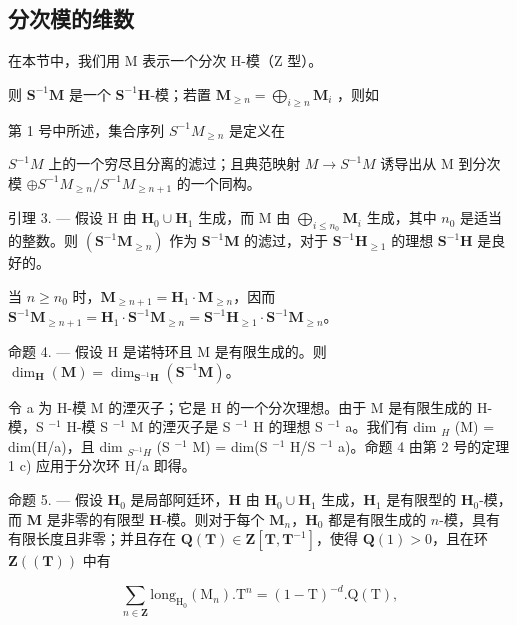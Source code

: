 \subsection{分次模的维数}

在本节中，我们用 M 表示一个分次 H-模（Z 型）。

则 \(\mathbf{S}^{-1}\mathbf{M}\) 是一个 \(\mathbf{S}^{-1}\mathbf{H}\)-模；若置 \(\mathbf{M}_{\geqslant n} = \bigoplus_{i\geqslant n}\mathbf{M}_i\) ，则如

第 1 号中所述，集合序列 \(S^{-1}M_{\geqslant n}\) 是定义在

\(S^{-1}M\) 上的一个穷尽且分离的滤过；且典范映射 \(M \to S^{-1}M\) 诱导出从 M 到分次模 \(\oplus S^{-1}M_{\geqslant n}/S^{-1}M_{\geqslant n+1}\) 的一个同构。

引理 3. --- 假设 H 由 \(\mathbf{H}_{0} \cup \mathbf{H}_{1}\) 生成，而 M 由 \(\bigoplus_{i \leqslant n_{0}} \mathbf{M}_{i}\) 生成，其中 \(n_{0}\) 是适当的整数。则 \((\mathbf{S}^{-1}\mathbf{M}_{\geqslant n})\) 作为 \(\mathbf{S}^{-1}\mathbf{M}\) 的滤过，对于 \(\mathbf{S}^{-1}\mathbf{H}_{\geqslant 1}\) 的理想 \(\mathbf{S}^{-1}\mathbf{H}\) 是良好的。

当 \(n \geqslant n_0\) 时，\(\mathbf{M}_{\geqslant n+1} = \mathbf{H}_1 \cdot \mathbf{M}_{\geqslant n}\)，因而 \(\mathbf{S}^{-1} \mathbf{M}_{\geqslant n+1} = \mathbf{H}_1 \cdot \mathbf{S}^{-1} \mathbf{M}_{\geqslant n} = \mathbf{S}^{-1} \mathbf{H}_{\geqslant 1} \cdot \mathbf{S}^{-1} \mathbf{M}_{\geqslant n}\)。

命题 4. --- 假设 H 是诺特环且 M 是有限生成的。则 \(\dim_{\mathbf{H}}(\mathbf{M}) = \dim_{\mathbf{S}^{-1}\mathbf{H}}(\mathbf{S}^{-1}\mathbf{M})\)。

令 a 为 H-模 M 的湮灭子；它是 H 的一个分次理想。由于 M 是有限生成的 H-模，S \(^{-1}\) H-模 S \(^{-1}\) M 的湮灭子是 S \(^{-1}\) H 的理想 S \(^{-1}\) a。我们有 dim \(_{H}\) (M) = dim(H/a)，且 dim \(_{S^{-1}H}\) (S \(^{-1}\) M) = dim(S \(^{-1}\) H/S \(^{-1}\) a)。命题 4 由第 2 号的定理 1 c) 应用于分次环 H/a 即得。

命题 5. --- 假设 \(\mathbf{H}_{0}\) 是局部阿廷环，\(\mathbf{H}\) 由 \(\mathbf{H}_{0} \cup \mathbf{H}_{1}\) 生成，\(\mathbf{H}_{1}\) 是有限型的 \(\mathbf{H}_{0}\)-模，而 \(\mathbf{M}\) 是非零的有限型 \(\mathbf{H}\)-模。则对于每个 \(\mathbf{M}_{n}\)，\(\mathbf{H}_{0}\) 都是有限生成的 \(n\)-模，具有有限长度且非零；并且存在 \(\mathbf{Q}(\mathbf{T}) \in \mathbf{Z}[\mathbf{T}, \mathbf{T}^{-1}]\)，使得 \(\mathbf{Q}(1) > 0\)，且在环 \(\mathbf{Z}((\mathbf{T}))\) 中有

\[
\sum_ {n \in \mathbf {Z}} \mathrm{long} _ {\mathrm{H} _ {0}} (\mathrm{M} _ {n}). \mathrm{T} ^ {n} = (1 - \mathrm{T}) ^ {- d}. \mathrm{Q} (\mathrm{T}),
\]

